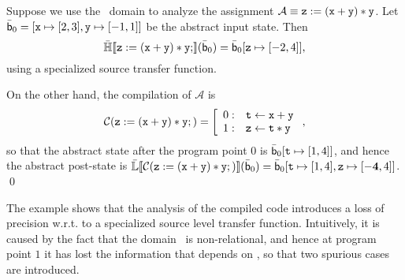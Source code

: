 \documentclass{llncs}
\newcommand{\comment}[1]{}
\begin{document}
\comment{
\begin{figure}[t]
  \[
  \begin{array}{r | r | l c r}
    \code{x} & \code{y} &\phantom{0} (\code{x} + \code{y}) * \code{y}  \\   
    2 &\phantom{0} -1 &\phantom{0} (2-1)* -1 & = & -1 \\
    2 & 1 &\phantom{0} (2 +1 ) * 1 & = & 3 \\
    3 & -1 &\phantom{0} (3 -1)*-1 & = & -2 \\
    3 & 1 &\phantom{0} (3 + 1) * 1 & = & 4
  \end{array}
  \]
  \caption{The tabular evaluation of $(\code{x} + \code{y}) * \code{y}$ in the abstract state  $\ael{b}_0 = [\code{x} \mapsto [2, 3], \code{y} \mapsto [-1, 1]]$. The table is for presentation purposes only, in practice an implementation will avoid explicitly computing the table, by using some smarter representation, ~\cite{Logozzo07}.}
  \label{fig:ex1}
\end{figure}
}
\begin{example}
\label{ex:intervalarithmetics}
Suppose we use the \Boxes\ domain to analyze the assignment $\mathcal{A} \equiv \mathtt{z} := (\mathtt{x} + \mathtt{y}) * \mathtt{y}$.
Let $\ael{b}_0 = [\code{x} \mapsto [2, 3], \code{y} \mapsto [-1, 1]]$ be the abstract input state.
Then
\[
\mathbb{\bar{H}}\llbracket \mathtt{\mathtt{z} := (\mathtt{x} + \mathtt{y}) * \mathtt{y};} \rrbracket(\bar{\mathsf{b}}_0) = \bar{\mathsf{b}}_0[\mathtt{z} \mapsto [-2, 4]],
\]
using a specialized source transfer function.
\comment{as the right-hand side expression evaluates according to the table in Fig.~\ref{fig:ex1}.}
On the other hand, the compilation of $\mathcal{A}$ is 
\begin{equation}
  \mathcal{C}(\mathtt{z} := (\mathtt{x} + \mathtt{y}) * \mathtt{y};) = \left [
    \begin{array}{r l}
      0: & \mathtt{t} \leftarrow \mathtt{x} + \mathtt{y} \\
      1: & \mathtt{z} \leftarrow \mathtt{t} * \mathtt{y}
    \end{array} \right. ,
  \label{ex:comp1}
\end{equation}
so that the abstract state after the program point $0$ is
$\bar{\mathsf{b}}_0[\mathtt{t} \mapsto [1,4]]$, and hence the abstract
post-state is $\mathbb{\bar{L}}\llbracket \mathtt{\mathcal{C}(\mathtt{z} := (\mathtt{x} + \mathtt{y}) *
\mathtt{y};)} \rrbracket (\bar{\mathsf{b}}_0) = \bar{\mathsf{b}}_0[\mathtt{t} \mapsto[1,4], \mathtt{z}
\mapsto [\mathbf{-4}, 4]]$. \qed
\end{example}
The example shows that the analysis of the compiled code introduces a
loss of precision w.r.t. to a specialized source level transfer
function.  Intuitively, it is caused by the fact that the domain
\Boxes\ is non-relational, and hence at program point $1$ it has lost
the information that  depends on , so that two
spurious cases are introduced.
\end{document}
